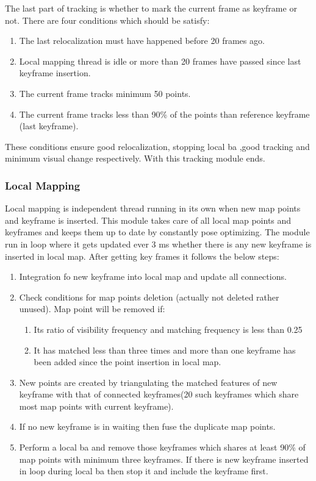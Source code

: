 \newline
The last part of tracking is whether to mark the current frame as keyframe or not. There are four conditions which should be satisfy:
\begin{enumerate}
	\item The last relocalization must have happened before 20 frames ago.
	\item Local mapping thread is idle or more than 20 frames have passed since last keyframe insertion.
	\item The current frame tracks minimum 50 points.
	\item The current frame tracks less than 90\% of the points than reference keyframe (last keyframe).
\end{enumerate}
These conditions ensure good relocalization, stopping local \acrshort{ba} ,good tracking and minimum visual change respectively. With this tracking module ends. 

\subsubsection{Local Mapping} 
Local mapping is independent thread running in its own when new map points and keyframe is inserted. This module takes care of all local map points and keyframes and keeps them up to date by constantly pose optimizing. The module run in loop where it gets updated ever 3 ms whether there is any new keyframe is inserted in local map. After getting key frames it follows the below steps: 
\begin{enumerate}
	\item Integration fo new keyframe into local map and update all connections. 
	\item Check conditions for map points deletion (actually not deleted rather unused). Map point will be removed if: 
	   \begin{enumerate}
		\item Its ratio of visibility frequency and matching frequency is less than 0.25
		\item It has matched less than three times and more than one keyframe has been added since the point insertion in local map.
	   \end{enumerate}
	\item New points are created by triangulating the matched features of new keyframe with that of connected keyframes(20 such keyframes which share most map points with current keyframe).  
	\item If no new keyframe is in waiting then fuse the duplicate map points.
	\item Perform a local \acrshort{ba} and remove those keyframes which shares at least 90\% of map points with minimum three keyframes. If there is new keyframe inserted in loop during local \acrshort{ba} then stop it and include the keyframe first.
\end{enumerate}

